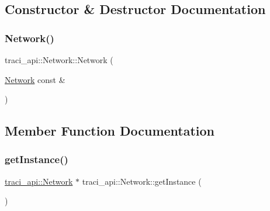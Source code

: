 \subsection{Constructor \& Destructor Documentation}
\mbox{\label{classtraci__api_1_1_network_a59991f6688c5c41ff4f3a5b9c941d952}} 
\subsubsection{\texorpdfstring{Network()}{Network()}}
{\footnotesize\ttfamily traci\+\_\+api\+::\+Network\+::\+Network (\begin{DoxyParamCaption}\item[{\hyperlink{classtraci__api_1_1_network}{Network} const \&}]{ }\end{DoxyParamCaption})\hspace{0.3cm}{\ttfamily [delete]}}



\subsection{Member Function Documentation}
\mbox{\label{classtraci__api_1_1_network_ab6c12d9fa0affbeeb0d068544adb4724}} 
\subsubsection{\texorpdfstring{get\+Instance()}{getInstance()}}
{\footnotesize\ttfamily \hyperlink{classtraci__api_1_1_network}{traci\+\_\+api\+::\+Network} $\ast$ traci\+\_\+api\+::\+Network\+::get\+Instance (\begin{DoxyParamCaption}{ }\end{DoxyParamCaption})\hspace{0.3cm}{\ttfamily [static]}}

